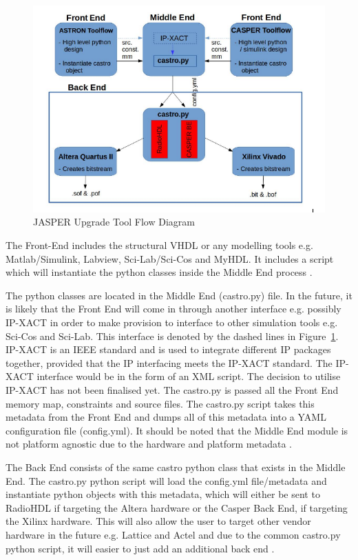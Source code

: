 \documentclass{ws-jai}
\begin{document}
\begin{figure}[h]
\centering
\includegraphics[width=150mm, scale=0.5]{jasper_ug_bd}
\caption{JASPER Upgrade Tool Flow Diagram}
\label{fig:jasper_ug_bd}
\end{figure}

The Front-End includes the structural VHDL or any modelling tools e.g. Matlab/Simulink, Labview, Sci-Lab/Sci-Cos and MyHDL. It includes a script which will instantiate the python classes inside the Middle End process \cite{Isaac16}.

The python classes are located in the Middle End (castro.py) file. In the future, it is likely that the Front End will come in through another interface e.g. possibly IP-XACT in order to make provision to interface to other simulation tools e.g. Sci-Cos and Sci-Lab. This interface is denoted by the dashed lines in Figure~\ref{fig:jasper_ug_bd}. IP-XACT is an IEEE standard and is used to integrate different IP packages together, provided that the IP interfacing meets the IP-XACT standard. The IP-XACT interface would be in the form of an XML script. The decision to utilise IP-XACT has not been finalised yet. The castro.py is passed all the Front End memory map, constraints and source files. The castro.py script takes this metadata from the Front End and dumps all of this metadata into a YAML configuration file (config.yml). It should be noted that the Middle End module is not platform agnostic due to the hardware and platform metadata \cite{Isaac16}.

The Back End consists of the same castro python class that exists in the Middle End. The castro.py python script will load the config.yml file/metadata and instantiate python objects with this metadata, which will either be sent to RadioHDL if targeting the Altera hardware or the Casper Back End, if targeting the Xilinx hardware. This will also allow the user to target other vendor hardware in the future e.g. Lattice and Actel and due to the common castro.py python script, it will easier to just add an additional back end \cite{Isaac16}.
\end{document}
